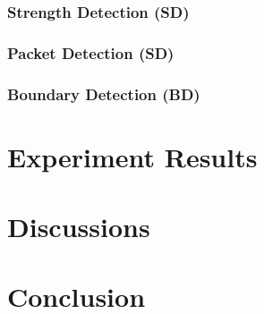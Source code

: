 \documentclass[journal,twoside]{IEEEtran}
\begin{document}
      \subsubsection{Strength Detection (SD)}

      \subsubsection{Packet Detection (SD)}

      \subsubsection{Boundary Detection (BD)}

  \section{Experiment Results}

  \section{Discussions}

  \section{Conclusion}

  
  
\end{document}
